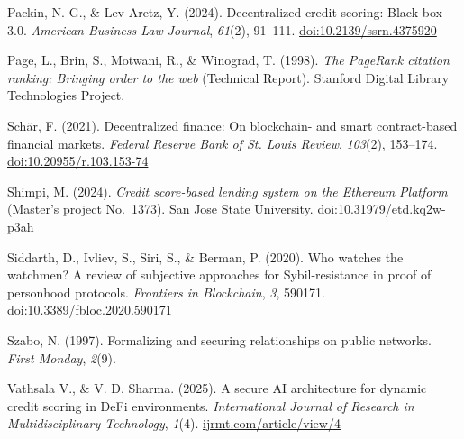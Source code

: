 \hangindent=0.5in  Packin, N. G., \& Lev-Aretz, Y. (2024). Decentralized credit scoring: Black box 3.0. \textit{American Business Law Journal}, \textit{61}(2), 91--111. \href{https://doi.org/10.2139/ssrn.4375920}{doi:10.2139/ssrn.4375920}\par

\hangindent=0.5in  Page, L., Brin, S., Motwani, R., \& Winograd, T. (1998). \textit{The PageRank citation ranking: Bringing order to the web} (Technical Report). Stanford Digital Library Technologies Project.\par

\hangindent=0.5in  Sch\"{a}r, F. (2021). Decentralized finance: On blockchain- and smart contract-based financial markets. \textit{Federal Reserve Bank of St. Louis Review}, \textit{103}(2), 153--174. \href{https://doi.org/10.20955/r.103.153-74}{doi:10.20955/r.103.153-74}\par

\hangindent=0.5in  Shimpi, M. (2024). \textit{Credit score-based lending system on the Ethereum Platform} (Master's project No.\ 1373). San Jose State University. \href{https://doi.org/10.31979/etd.kq2w-p3ah}{doi:10.31979/etd.kq2w-p3ah}\par

\hangindent=0.5in  Siddarth, D., Ivliev, S., Siri, S., \& Berman, P. (2020). Who watches the watchmen? A review of subjective approaches for Sybil-resistance in proof of personhood protocols. \textit{Frontiers in Blockchain}, \textit{3}, 590171. \href{https://doi.org/10.3389/fbloc.2020.590171}{doi:10.3389/fbloc.2020.590171}\par

\hangindent=0.5in  Szabo, N. (1997). Formalizing and securing relationships on public networks. \textit{First Monday}, \textit{2}(9).\par

\hangindent=0.5in  Vathsala V., \& V. D. Sharma. (2025). A secure AI architecture for dynamic credit scoring in DeFi environments. \textit{International Journal of Research in Multidisciplinary Technology}, \textit{1}(4). \href{https://ijrmt.com/index.php/ijrmt/article/view/4}{ijrmt.com/article/view/4}\par
